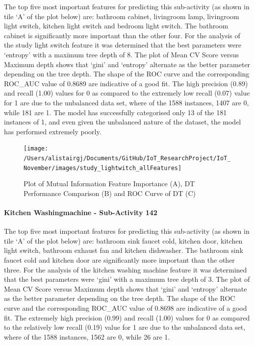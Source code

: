\documentclass[11pt,]{article}
\let\oldparagraph\paragraph
\renewcommand{\paragraph}[1]{\oldparagraph{#1}\mbox{}}
\begin{document}
The top five most important features for predicting this sub-activity
(as shown in tile `A' of the plot below) are: bathroom cabinet,
livingroom lamp, livingroom light switch, kitchen light switch and
bedroom light switch. The bathroom cabinet is significantly more
important than the other four. For the analysis of the study light
switch feature it was determined that the best parameters were `entropy'
with a maximum tree depth of 8. The plot of Mean CV Score versus Maximum
depth shows that `gini' and `entropy' alternate as the better parameter
depending on the tree depth. The shape of the ROC curve and the
corresponding ROC\_AUC value of 0.8689 are indicative of a good fit. The
high precision (0.89) and recall (1.00) values for 0 as compared to the
extremely low recall (0.07) value for 1 are due to the unbalanced data
set, where of the 1588 instances, 1407 are 0, while 181 are 1. The model
has successfully categorised only 13 of the 181 instances of 1, and even
given the unbalanced nature of the dataset, the model has performed
extremely poorly.

\begin{figure}[H]

{\centering \texttt{[image: /Users/alistairgj/Documents/GitHub/IoT\_ResearchProject/IoT\_November/images/study\_lightwitch\_allFeatures]} 

}

\caption{Plot of Mutual Information Feature Importance (A), DT Performance Comparison (B) and ROC Curve of DT (C)}\label{fig:unnamed-chunk-17}
\end{figure}

\hypertarget{kitchen-washingmachine---sub-activity-142-1}{%
\paragraph{Kitchen Washingmachine - Sub-Activity
142}\label{kitchen-washingmachine---sub-activity-142-1}}

The top five most important features for predicting this sub-activity
(as shown in tile `A' of the plot below) are: bathroom sink faucet cold,
kitchen door, kitchen light switch, bathroom exhaust fan and kitchen
dishwasher. The bathroom sink faucet cold and kitchen door are
significantly more important than the other three. For the analysis of
the kitchen washing machine feature it was determined that the best
parameters were `gini' with a maximum tree depth of 3. The plot of Mean
CV Score versus Maximum depth shows that `gini' and `entropy' alternate
as the better parameter depending on the tree depth. The shape of the
ROC curve and the corresponding ROC\_AUC value of 0.8698 are indicative
of a good fit. The extremely high precision (0.99) and recall (1.00)
values for 0 as compared to the relatively low recall (0.19) value for 1
are due to the unbalanced data set, where of the 1588 instances, 1562
are 0, while 26 are 1.
\end{document}
